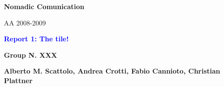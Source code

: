 \documentclass[12pt]{article}
\begin{document}
\begin{titlepage}
\begin{figure}[ht]
	\end{figure}
	{
	\large \bfseries Nomadic Comunication\par
	AA 2008-2009
	}\par
	\vspace{1.5cm}
	{
	\Large \bfseries \textcolor{blue}{Report 1: The tile!} \par
	}
	\vspace{1.0cm}
	{
	\large \bfseries {Group N. XXX} \par
	}
	\vspace{0.3cm}
	{
	\large \bfseries {Alberto M. Scattolo, Andrea Crotti, Fabio Cannioto, Christian Plattner}
	}
	\vspace{1.0cm}
	\begin{abstract}
	\end{abstract}
\end{titlepage}

\thispagestyle{empty}
\tableofcontents
\clearpage
\setcounter{page}{1}

%
%
%
\end{document}
